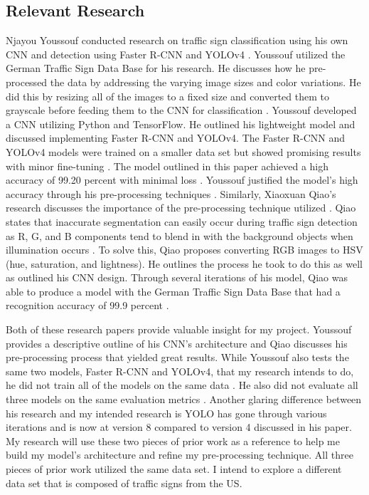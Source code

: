 \documentclass[10pt,twocolumn]{article}
\begin{document}
\subsection{Relevant Research}
Njayou Youssouf conducted research on traffic sign classification using his own CNN and detection using Faster R-CNN and YOLOv4 \textcite{Youssouf}. Youssouf utilized the German Traffic Sign Data Base for his research. He discusses how he pre-processed the data by addressing the varying image sizes and color variations. He did this by resizing all of the images to a fixed size and converted them to grayscale before feeding them to the CNN for classification \textcite{Youssouf}. Youssouf developed a CNN utilizing Python and TensorFlow. He outlined his lightweight model and discussed implementing Faster R-CNN and YOLOv4. The Faster R-CNN and YOLOv4 models were trained on a smaller data set but showed promising results with minor fine-tuning \textcite{Youssouf}. The model outlined in this paper achieved a high accuracy of 99.20 percent with minimal loss \textcite{Youssouf}. Youssouf justified the model's high accuracy through his pre-processing techniques \textcite{Youssouf}. Similarly, Xiaoxuan Qiao's research discusses the importance of the pre-processing technique utilized \textcite{HSV}. Qiao states that inaccurate segmentation can easily occur during traffic sign detection as R, G, and B components tend to blend in with the background objects when illumination occurs \textcite{HSV}. To solve this, Qiao proposes converting RGB images to HSV (hue, saturation, and lightness). He outlines the process he took to do this as well as outlined his CNN design. Through several iterations of his model, Qiao was able to produce a model with the German Traffic Sign Data Base that had a recognition accuracy of 99.9 percent \textcite{HSV}. 

Both of these research papers provide valuable insight for my project. Youssouf provides a descriptive outline of his CNN's architecture and Qiao discusses his pre-processing process that yielded great results. While Youssouf also tests the same two models, Faster R-CNN and YOLOv4, that my research intends to do, he did not train all of the models on the same data \textcite{Youssouf}. He also did not evaluate all three models on the same evaluation metrics \textcite{Youssouf}. Another glaring difference between his research and my intended research is YOLO has gone through various iterations and is now at version 8 compared to version 4 discussed in his paper. My research will use these two pieces of prior work as a reference to help me build my model's architecture and refine my pre-processing technique. All three pieces of prior work utilized the same data set. I intend to explore a different data set that is composed of traffic signs from the US. 
\end{document}
